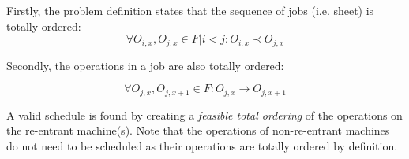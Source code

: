 \documentclass[]{article}
\begin{document}
Firstly, the problem definition states that the sequence of jobs (i.e. sheet) is totally ordered:
\begin{equation}
\forall O_{i,x}, O_{j,x} \in F | i < j : O_{i,x} \prec O_{j,x}
\end{equation}

Secondly, the operations in a job are also totally ordered:

\begin{equation}
\forall O_{j,x}, O_{j,x+1} \in F : O_{j,x} \to O_{j,x+1}
\end{equation}

A valid schedule is found by creating a \textit{feasible total ordering} of the operations on the re-entrant machine(s). Note that the operations of non-re-entrant machines do not need to be scheduled as their operations are totally ordered by definition.
\end{document}
